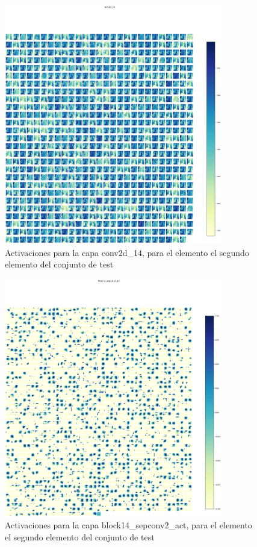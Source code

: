 \documentclass[11pt,a4paper]{article}
\theoremstyle{definition}
\begin{document}
\begin{figure}[H]
\centering
\includegraphics[width=0.85\textwidth]{./images/actmap3.png}
\caption{Activaciones para la capa conv2d\_14, para el elemento el segundo elemento del conjunto de test}
\end{figure}

\begin{figure}[H]
\centering
\includegraphics[width=0.85\textwidth]{./images/actmap4.png}
\caption{Activaciones para la capa block14\_sepconv2\_act, para el elemento el segundo elemento del conjunto de test}
\end{figure}
\end{document}
